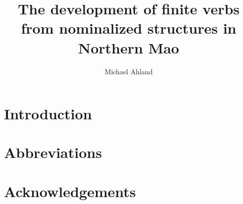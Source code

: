 \documentclass[output=paper]{langsci/langscibook}
\title{The development of finite verbs from nominalized structures in Northern Mao}
\author{%
 Michael Ahland \affiliation{}
}
\begin{document}
\section{Introduction} 

\section*{Abbreviations}
\section*{Acknowledgements}

\printbibliography[heading=subbibliography,notkeyword=this]
\end{document}
